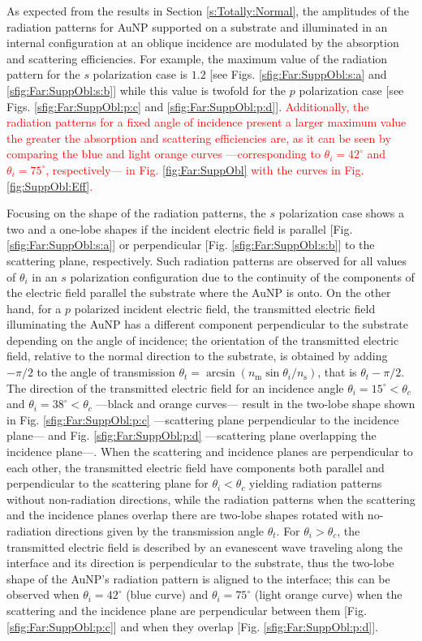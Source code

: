 As expected from the results in Section \ref{s:Totally:Normal}, the amplitudes of the radiation patterns for AuNP supported on a substrate and illuminated in an internal configuration at an oblique incidence are modulated by the absorption and scattering efficiencies. For example, the maximum value of the radiation pattern for the $s$ polarization case is $1.2$ [see Figs. \ref{sfig:Far:SuppObl:s:a} and \ref{sfig:Far:SuppObl:s:b}] while this value is twofold for the $p$ polarization case [see Figs. \ref{sfig:Far:SuppObl:p:c} and \ref{sfig:Far:SuppObl:p:d}]. \textcolor{red}{Additionally, the radiation patterns for a fixed angle of incidence present a larger maximum value the greater the absorption and scattering efficiencies are, as it can be seen by comparing the blue and light orange curves ---corresponding to $\theta_i = 42^\circ$ and $\theta_i = 75^\circ$, respectively--- in Fig. \ref{fig:Far:SuppObl} with the curves in Fig. \ref{fig:SuppObl:Eff}.}

Focusing on the shape of the radiation patterns, the $s$ polarization case shows a two and a one-lobe shapes if the incident electric field is parallel [Fig. \ref{sfig:Far:SuppObl:s:a}] or perpendicular [Fig. \ref{sfig:Far:SuppObl:s:b}] to the scattering plane, respectively. Such radiation patterns are observed for all values of $\theta_i$ in an $s$ polarization configuration due to the continuity of the components of the electric field parallel the substrate where the AuNP is onto. On the other hand, for a $p$ polarized incident electric field, the transmitted electric field illuminating the AuNP has a different component perpendicular to the substrate depending on the angle of incidence; the orientation of the transmitted electric field, relative to the normal direction to the substrate, is obtained by adding $-\pi/2$ to the angle of transmission $\theta_t = \arcsin(n_\text{m}\sin\theta_i/n_\text{s})$, that is $\theta_t - \pi/2$. The direction of the transmitted electric field for an incidence angle $\theta_i = 15^\circ<\theta_c$ and $\theta_i = 38^\circ<\theta_c$ ---black and orange curves--- result in the two-lobe shape shown in Fig. \ref{sfig:Far:SuppObl:p:c} ---scattering plane perpendicular to the incidence plane--- and Fig. \ref{sfig:Far:SuppObl:p:d} ---scattering plane overlapping the incidence plane---. When the scattering and incidence planes are perpendicular to each other, the transmitted electric field have components both parallel and perpendicular to the scattering plane for $\theta_i<\theta_c$ yielding radiation patterns without non-radiation directions, while the radiation patterns when the scattering and the incidence planes overlap there are two-lobe shapes rotated with no-radiation directions given by the transmission angle $\theta_t$. For $\theta_i>\theta_c$, the transmitted electric field is described by an evanescent wave traveling along the interface and its direction is perpendicular to the substrate, thus the two-lobe shape of the AuNP's radiation pattern is aligned to the interface; this can be observed when $\theta_i = 42^\circ$ (blue curve) and $\theta_i = 75^\circ$ (light orange curve) when the scattering and the incidence plane are perpendicular between them [Fig. \ref{sfig:Far:SuppObl:p:c}] and when they overlap [Fig. \ref{sfig:Far:SuppObl:p:d}].

